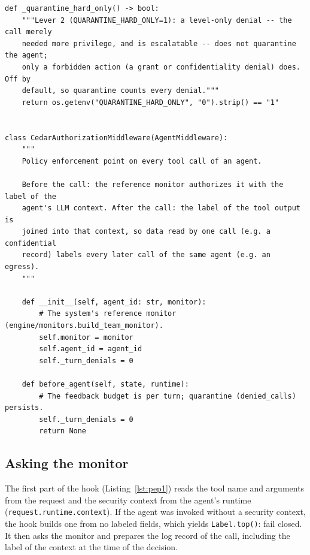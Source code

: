 \documentclass[11pt,a4paper]{article}
\DeclareRobustCommand{\code}[1]{{\renewcommand{\_}{\textunderscore\allowbreak}\texttt{#1}}}
\begin{document}
\begin{lstlisting}[firstnumber=10,style=py,caption={PEP: Lever~2 switch, constructor and per-turn reset (\texttt{security/authorization\_middleware.py}, lines 10--37)},label={lst:pep0}]
def _quarantine_hard_only() -> bool:
    """Lever 2 (QUARANTINE_HARD_ONLY=1): a level-only denial -- the call merely
    needed more privilege, and is escalatable -- does not quarantine the agent;
    only a forbidden action (a grant or confidentiality denial) does. Off by
    default, so quarantine counts every denial."""
    return os.getenv("QUARANTINE_HARD_ONLY", "0").strip() == "1"


class CedarAuthorizationMiddleware(AgentMiddleware):
    """
    Policy enforcement point on every tool call of an agent.

    Before the call: the reference monitor authorizes it with the label of the
    agent's LLM context. After the call: the label of the tool output is
    joined into that context, so data read by one call (e.g. a confidential
    record) labels every later call of the same agent (e.g. an egress).
    """

    def __init__(self, agent_id: str, monitor):
        # The system's reference monitor (engine/monitors.build_team_monitor).
        self.monitor = monitor
        self.agent_id = agent_id
        self._turn_denials = 0

    def before_agent(self, state, runtime):
        # The feedback budget is per turn; quarantine (denied_calls) persists.
        self._turn_denials = 0
        return None
\end{lstlisting}

\subsection{Asking the monitor}

The first part of the hook (Listing~\ref{lst:pep1}) reads the tool name and arguments
from the request and the security context from the agent's runtime
(\code{request.runtime.context}). If the agent was invoked without a security context,
the hook builds one from no labeled fields, which yields \code{Label.top()}: fail closed.
It then asks the monitor and prepares the log record of the call, including the label of
the context at the time of the decision.
\end{document}
